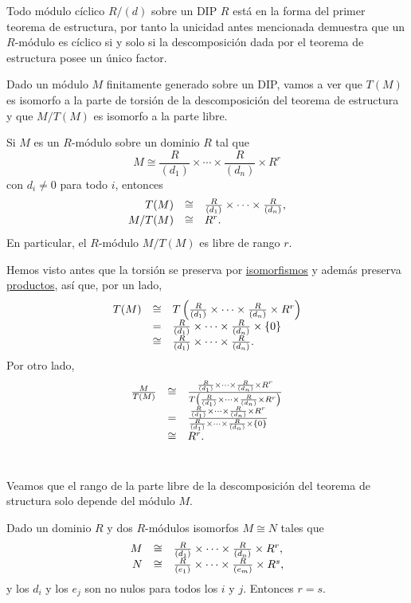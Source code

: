 
Todo módulo cíclico \(R/(d)\) sobre un DIP \(R\) está en la forma del
primer teorema de estructura, por tanto la unicidad antes mencionada
demuestra que un \(R\)-módulo es cíclico si y solo si la descomposición
dada por el teorema de estructura posee un único factor. 

Dado un módulo \(M\) finitamente generado sobre un DIP, vamos a ver que
\(T(M)\) es isomorfo a la parte de torsión de la descomposición del
teorema de estructura y que \(M/T(M)\) es isomorfo a la parte libre.

\label{partsoffg} Si \(M\) es un \(R\)-módulo sobre
un dominio \(R\) tal que
\[M\cong \frac{R}{(d_1)}\times \cdots \times\frac{R}{(d_n)}\times R^{r}\]
con \(d_i\neq 0\) para todo \(i\), entonces \[
\begin{array}{rcl}
T(M)&\cong&\frac{R}{(d_1)}\times \cdots \times\frac{R}{(d_n)},\cr
M/T(M)&\cong& R^r.
\end{array}
\] En particular, el \(R\)-módulo \(M/T(M)\) es libre de rango \(r\).


Hemos visto antes que la torsión se preserva por
\protect\hyperlink{torsionquotient}{isomorfismos} y además preserva
\protect\hyperlink{torsionproduct}{productos}, así que, por un lado, \[
\begin{array}{rcl}
T(M)&\cong&T\left(\frac{R}{(d_1)}\times \cdots \times\frac{R}{(d_n)}\times R^{r}\right)\cr
&=&\frac{R}{(d_1)}\times \cdots \times\frac{R}{(d_n)}\times \{0\}\cr
&\cong&\frac{R}{(d_1)}\times \cdots \times\frac{R}{(d_n)}.
\end{array}
\] Por otro lado, \[
\begin{array}{rcl}
\frac{M}{T(M)}&\cong&
\frac{\frac{R}{(d_1)}\times \cdots \times\frac{R}{(d_n)}\times R^{r}}{T\left(\frac{R}{(d_1)}\times \cdots \times\frac{R}{(d_n)}\times R^{r}\right)}\cr
&=& \frac{\frac{R}{(d_1)}\times \cdots \times\frac{R}{(d_n)}\times R^{r}}{\frac{R}{(d_1)}\times \cdots \times\frac{R}{(d_n)}\times\{0\}}\cr
&\cong&R^r.
\end{array}\]\\

Veamos que el rango de la parte libre de la descomposición del teorema
de structura solo depende del módulo \(M\).

\label{equalrank} Dado un dominio \(R\) y dos
\(R\)-módulos isomorfos \(M\cong N\) tales que \[
\begin{array}{rcl}
M&\cong&\frac{R}{(d_1)}\times \cdots \times\frac{R}{(d_n)}\times R^{r},
\cr
N&\cong &\frac{R}{(e_1)}\times \cdots \times\frac{R}{(e_m)}\times R^{s},
\end{array}
\] y los \(d_i\) y los \(e_j\) son no nulos para todos los \(i\) y
\(j\). Entonces \(r=s\). 

